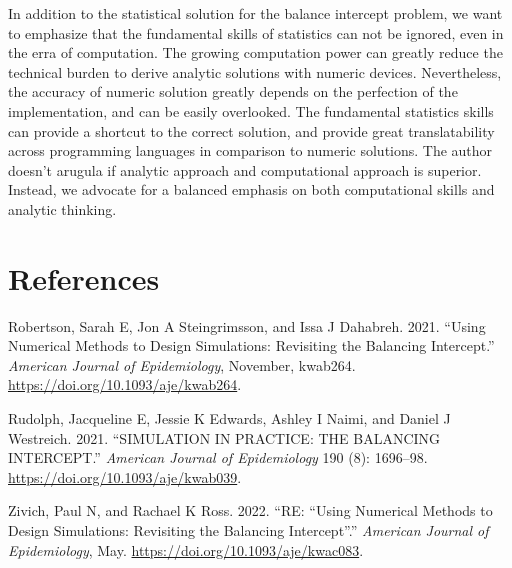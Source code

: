\documentclass[
]{article}
\newlength{\cslhangindent}
\newlength{\cslentryspacingunit} %
\newenvironment{CSLReferences}[2] %
 {%
  \setlength{\parindent}{0pt}
  \ifodd #1
  \let\oldpar\par
  \def\par{\hangindent=\cslhangindent\oldpar}
  \fi
  \setlength{\parskip}{#2\cslentryspacingunit}
 }%
 {}
\begin{document}
In addition to the statistical solution for the balance intercept
problem, we want to emphasize that the fundamental skills of statistics
can not be ignored, even in the erra of computation. The growing
computation power can greatly reduce the technical burden to derive
analytic solutions with numeric devices. Nevertheless, the accuracy of
numeric solution greatly depends on the perfection of the
implementation, and can be easily overlooked. The fundamental statistics
skills can provide a shortcut to the correct solution, and provide great
translatability across programming languages in comparison to numeric
solutions. The author doesn't arugula if analytic approach and
computational approach is superior. Instead, we advocate for a balanced
emphasis on both computational skills and analytic thinking.

\hypertarget{references}{%
\section*{References}\label{references}}

\hypertarget{refs}{}
\begin{CSLReferences}{1}{0}
\leavevmode{}%
Robertson, Sarah E, Jon A Steingrimsson, and Issa J Dahabreh. 2021.
{``Using Numerical Methods to Design Simulations: Revisiting the
Balancing Intercept.''} \emph{American Journal of Epidemiology},
November, kwab264. \url{https://doi.org/10.1093/aje/kwab264}.

\leavevmode{}%
Rudolph, Jacqueline E, Jessie K Edwards, Ashley I Naimi, and Daniel J
Westreich. 2021. {``SIMULATION IN PRACTICE: THE BALANCING INTERCEPT.''}
\emph{American Journal of Epidemiology} 190 (8): 1696--98.
\url{https://doi.org/10.1093/aje/kwab039}.

\leavevmode{}%
Zivich, Paul N, and Rachael K Ross. 2022. {``RE: {``}Using Numerical
Methods to Design Simulations: Revisiting the Balancing
Intercept{''}.''} \emph{American Journal of Epidemiology}, May.
\url{https://doi.org/10.1093/aje/kwac083}.

\end{CSLReferences}
\end{document}
